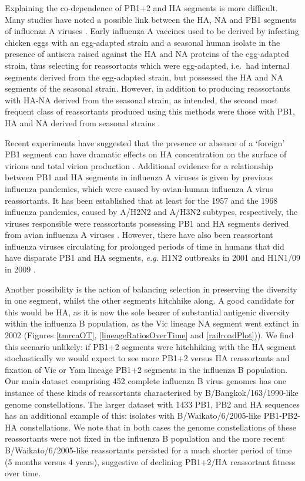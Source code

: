 \documentclass[11pt,oneside,letterpaper]{article}
\begin{document}
Explaining the co-dependence of PB1+2 and HA segments is more difficult.
Many studies have noted a possible link between the HA, NA and PB1 segments of influenza A viruses \cite{bergeron2010,fulvini2011}.
Early influenza A vaccines used to be derived by infecting chicken eggs with an egg-adapted strain and a seasonal human isolate in the presence of antisera raised against the HA and NA proteins of the egg-adapted strain, thus selecting for reassortants which were egg-adapted, i.e.\ had internal segments derived from the egg-adapted strain, but possessed the HA and NA segments of the seasonal strain.
However, in addition to producing reassortants with HA-NA derived from the seasonal strain, as intended, the second most frequent class of reassortants produced using this methods were those with PB1, HA and NA derived from seasonal strains \cite{bergeron2010,fulvini2011}.

Recent experiments have suggested that the presence or absence of a `foreign' PB1 segment can have dramatic effects on HA concentration on the surface of virions and total virion production \cite{cobbin2013}.
Additional evidence for a relationship between PB1 and HA segments in influenza A viruses is given by previous influenza pandemics, which were caused by avian-human influenza A virus reassortants.
It has been established that at least for the 1957 and the 1968 influenza pandemics, caused by A/H2N2 and A/H3N2 subtypes, respectively, the viruses responsible were reassortants possessing PB1 and HA segments derived from avian influenza A viruses \cite{kawaoka1989}.
However, there have also been reassortant influenza viruses circulating for prolonged periods of time in humans that did have disparate PB1 and HA segments, \textit{e.g.} H1N2 outbreaks in 2001 \cite{gregory2002} and H1N1/09 in 2009 \cite{smith2009}.

Another possibility is the action of balancing selection in preserving the diversity in one segment, whilst the other segments hitchhike along.
A good candidate for this would be HA, as it is now the sole bearer of substantial antigenic diversity within the influenza B population, as the Vic lineage NA segment went extinct in 2002 (Figures \ref{tmrcaOT}, \ref{lineageRatiosOverTime} and \ref{railroadPlot})).
We find this scenario unlikely: if PB1+2 segments were hitchhiking with the HA segment stochastically we would expect to see more PB1+2 versus HA reassortants and fixation of Vic or Yam lineage PB1+2 segments in the influenza B population.
Our main dataset comprising 452 complete influenza B virus genomes has one instance of these kinds of reassortants characterised by B/Bangkok/163/1990-like genome constellations.
The larger dataset with 1433 PB1, PB2 and HA sequences has an additional example of this: isolates with B/Waikato/6/2005-like PB1-PB2-HA constellations.
We note that in both cases the genome constellations of these reassortants were not fixed in the influenza B population and the more recent B/Waikato/6/2005-like reassortants persisted for a much shorter period of time (5 months versus 4 years), suggestive of declining PB1+2/HA reassortant fitness over time.
\end{document}
